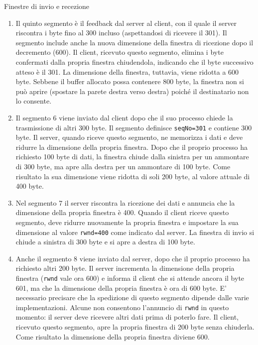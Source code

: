 \begin{Example}{Finestre di invio e recezione}{}
\begin{enumerate}
        \item  Il quinto segmento è il feedback dal server al client, con il quale il server riscontra i byte fino al 300 incluso (aspettandosi di ricevere il 301). Il segmento include anche la nuova dimensione della finestra di ricezione dopo il decremento (600). Il client, ricevuto questo segmento, elimina i byte confermati dalla propria finestra chiudendola, indicando che il byte successivo atteso è il 301. La dimensione della finestra, tuttavia, viene ridotta a 600 byte. Sebbene il buffer allocato possa contenere 800 byte, la finestra non si può aprire (spostare la parete destra verso destra) poiché il destinatario non lo consente.
        \item Il segmento 6 viene inviato dal client dopo che il suo processo chiede la trasmissione di altri 300 byte. Il segmento definisce \verb|seqNo=301| e contiene 300 byte. Il server, quando riceve questo segmento, ne memorizza i dati e deve ridurre la dimensione della propria finestra. Dopo che il proprio processo ha richiesto 100 byte di dati, la finestra chiude dalla sinistra per un ammontare di 300 byte, ma apre alla destra per un ammontare di 100 byte. Come risultato la sua dimensione viene ridotta di soli 200 byte, al valore attuale di 400 byte.
        \item Nel segmento 7 il server riscontra la ricezione dei dati e annuncia che la dimensione della propria finestra è 400. Quando il client riceve questo segmento, deve ridurre nuovamente la propria finestra e impostare la sua dimensione al valore \verb|rwnd=400| come indicato dal server. La finestra di invio si chiude a sinistra di 300 byte e si apre a destra di 100 byte.
        \item Anche il segmento 8 viene inviato dal server, dopo che il proprio processo ha richiesto altri 200 byte. Il server incrementa la dimensione della propria finestra (\verb|rwnd| vale ora 600) e informa il client che si attende ancora il byte 601, ma che la dimensione della propria finestra è ora di 600 byte. E' necessario precisare che la spedizione di questo segmento dipende dalle varie implementazioni. Alcune non consentono l'annuncio di \verb|rwnd| in questo momento: il server deve ricevere altri dati prima di poterlo fare. Il client, ricevuto questo segmento, apre la propria finestra di 200 byte senza chiuderla. Come risultato la dimensione della propria finestra diviene 600.
    \end{enumerate}
\end{Example}

